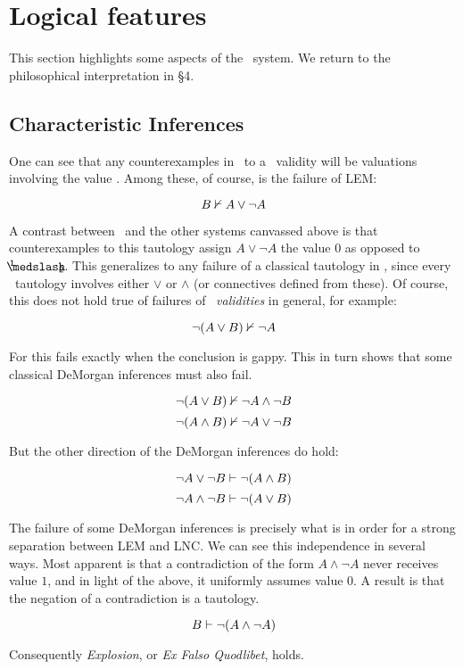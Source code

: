 \section{Logical features}\label{logicalFeatures}

This section highlights some aspects of the \GO\ system. We return to the philosophical interpretation in \S 4. 

\subsection{Characteristic Inferences}\label{inferences}

One can see that any counterexamples in \GO\ to a \CPL\ validity will be valuations involving the value \oneHalf. Among these, of course, is the failure of LEM:

\[ {B}\nvdash{A \vee \neg A} \]

\noindent A contrast between \GO\ and the other systems canvassed above is that counterexamples to this tautology assign $A \vee \neg A$ the value $0$ as opposed to $\oneHalf$. This generalizes to any failure of a classical tautology in \GO, since every \CPL\ tautology involves either $\vee$ or $\wedge$ (or connectives defined from these). Of course, this does not hold true of failures of \CPL\ \emph{validities} in general, for example:

\[ {\neg (A \vee B)}\nvdash{\neg A} \]

\noindent For this fails exactly when the conclusion is gappy. This in turn shows that some classical DeMorgan inferences must also fail.

\[ {\neg(A \vee B)}\nvdash{\neg A \wedge \neg B} \]
\[ {\neg(A \wedge B)}\nvdash{\neg A \vee \neg B} \]

\noindent But the other direction of the DeMorgan inferences do hold:

\[ {\neg A \vee \neg B}\vdash{\neg(A \wedge B)} \]
\[ {\neg A \wedge \neg B}\vdash{\neg(A \vee B)} \]

	The failure of some DeMorgan inferences is precisely what is in order for a strong separation between LEM and LNC. We can see this independence in several ways. Most apparent is that a contradiction of the form $A \wedge \neg A$ never receives value $1$, and in light of the above, it uniformly assumes value $0$. A result is that the negation of a contradiction is a tautology.

\[ {B}\vdash{\neg(A \wedge \neg A)} \]

\noindent Consequently \emph{Explosion}, or \emph{Ex Falso Quodlibet}, holds.

